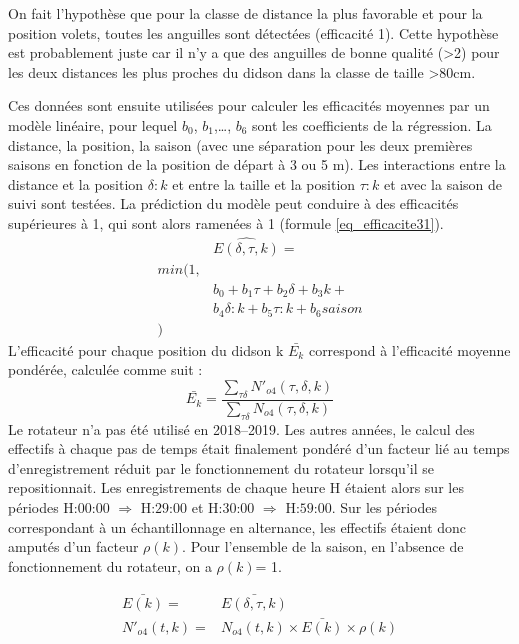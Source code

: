 \documentclass[11pt,twocolumn,titlepage,twoside]{article}
\begin{document}
On fait l'hypothèse que pour la classe de distance la plus favorable et pour la
position volets, toutes les anguilles sont détectées (efficacité 1). Cette
hypothèse est probablement juste car il n'y a que des anguilles de bonne qualité (>2) 
pour les deux distances les plus proches du
didson dans la classe de taille >80cm.

Ces données sont ensuite utilisées pour calculer les efficacités moyennes par un modèle linéaire, pour lequel $b_0$, $b_1$,\dots,
$b_6$ sont les coefficients de la régression.
La distance, la position, la saison (avec une séparation pour les deux premières
saisons en fonction de la position de départ à 3 ou 5 m). Les interactions entre
la distance et la position $\delta:k$ et entre la taille et la position $\tau:k$ et avec la saison de suivi sont testées. 
 La prédiction du modèle peut conduire à des efficacités supérieures à 1, qui
 sont alors ramenées à 1 (formule \ref{eq_efficacite31}).
\begin{equation}
\label{eq_efficacite31}
\begin{aligned}
&\widehat{E(\delta,\tau,k)} = \\
min(1,&\\
&b_0+b_1\tau+b_2\delta+b_3 k+\\
&b_4\delta:k+b_5\tau:k+b_6 saison\\
)&
\end{aligned}
\end{equation} 
L'efficacité pour chaque position du didson k $\bar{E_k}$
correspond à l'efficacité moyenne pondérée, calculée comme suit :
\begin{equation}
\label{eq_efficacite32}
\bar{E_k}=\frac{\sum_{\tau \delta}N'_{o4}(\tau,\delta,k) }{\sum_{\tau \delta}N_{o4}(\tau,\delta,k)}
\end{equation} 
Le rotateur n'a pas été utilisé en 2018--2019. Les autres années, le calcul
des effectifs à chaque pas de temps était finalement pondéré d'un facteur lié au
temps d'enregistrement réduit par le fonctionnement du rotateur lorsqu'il se
repositionnait. Les enregistrements de chaque heure H étaient alors sur les
périodes $\text{H:00:00}$ $\Rightarrow$ $\text{H:29:00}$ et $\text{H:30:00}$ $\Rightarrow$ $\text{H:59:00}$. 
Sur les périodes correspondant à un échantillonnage en alternance, les effectifs
étaient donc amputés d'un facteur $\rho(k)$. Pour l'ensemble de la saison, en
l'absence de fonctionnement du rotateur, on a $\rho(k)$= 1.

\begin{equation}
\label{eq_efficacite4}
\begin{aligned}
\bar{E(k)}=&\bar{E(\delta,\tau,k)}\\
N'_{o4}(t,k)=& N_{o4}(t,k) \times \bar{E(k)} \times \rho(k)
\end{aligned}
\end{equation} 
\end{document}

